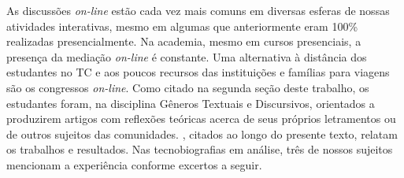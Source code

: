 \documentclass{textolivre}
\begin{document}
As discussões \textit{on-line} estão cada vez mais comuns em diversas esferas de nossas atividades interativas, mesmo em algumas que anteriormente eram 100\% realizadas presencialmente. Na academia, mesmo em cursos presenciais, a presença da mediação \textit{on-line} é constante. Uma alternativa à distância dos estudantes no TC e aos poucos recursos das instituições e famílias para viagens são os congressos \textit{on-line}. Como citado na segunda seção deste trabalho, os estudantes foram, na disciplina Gêneros Textuais e Discursivos, orientados a produzirem artigos com reflexões teóricas acerca de seus próprios letramentos ou de outros sujeitos das comunidades. \textcite{magnani_da_2018, castro_reflexao_2017}, citados ao longo do presente texto, relatam os trabalhos e resultados. Nas tecnobiografias em análise, três de nossos sujeitos mencionam a experiência conforme excertos a seguir.

\end{document}

